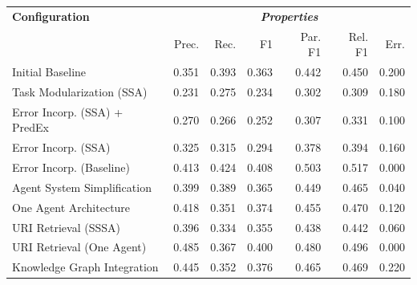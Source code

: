\documentclass[a4paper,oneside,bibliography=totoc]{scrbook}
\begin{document}
\begin{table}[h]
  \centering
  \begin{tabular}{p{4cm}|rrrrrr}
    \toprule
    \textbf{Configuration}               & \multicolumn{6}{c}{\textit{\textbf{Properties}}}                                                                                      \\
                                         & Prec.                                            & Rec.           & F1             & Par. F1        & Rel. F1        & Err.           \\
    \midrule
    Initial Baseline                     & 0.351                                            & 0.393          & 0.363          & 0.442          & 0.450          & 0.200          \\
    Task Modularization (SSA)            & 0.231                                            & 0.275          & 0.234          & 0.302          & 0.309          & 0.180          \\
    Error Incorp. (SSA) + PredEx         & 0.270                                            & 0.266          & 0.252          & 0.307          & 0.331          & 0.100          \\
    Error Incorp. (SSA)                  & 0.325                                            & 0.315          & 0.294          & 0.378          & 0.394          & 0.160          \\
    Error Incorp. (Baseline)             & 0.413                                            & 0.424          & 0.408          & 0.503          & 0.517          & 0.000          \\
    Agent System Simplification          & 0.399                                            & 0.389          & 0.365          & 0.449          & 0.465          & 0.040          \\
    One Agent Architecture               & 0.418                                            & 0.351          & 0.374          & 0.455          & 0.470          & 0.120          \\
    URI Retrieval (SSSA)                 & 0.396                                            & 0.334          & 0.355          & 0.438          & 0.442          & 0.060          \\
    URI Retrieval (One Agent)            & 0.485                                            & 0.367          & 0.400          & 0.480          & 0.496          & 0.000          \\
    Knowledge Graph Integration          & 0.445                                            & 0.352          & 0.376          & 0.465          & 0.469          & 0.220          \\

\end{tabular}
\end{table}
\end{document}
